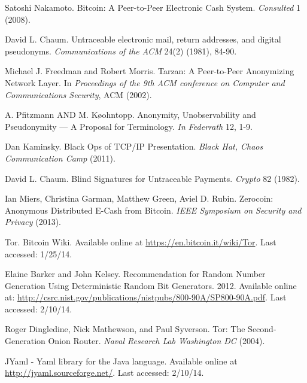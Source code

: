 \documentclass[conference]{IEEEtran}
\begin{document}







\begin{thebibliography}{1}

 Satoshi Nakamoto. Bitcoin: A Peer-to-Peer Electronic Cash System. \emph{Consulted} 1 (2008).

 David L. Chaum. Untraceable electronic mail, return addresses, and digital pseudonyms. \emph{Communications of the ACM} 24(2) (1981), 84-90.

 Michael J. Freedman and Robert Morris. Tarzan: A Peer-to-Peer Anonymizing Network Layer. In \emph{Proceedings of the 9th ACM conference on Computer and Communications Security}, ACM (2002).

 A. Pfitzmann AND M. K\o{o}hntopp. Anonymity, Unobservability and Pseudonymity — A Proposal for Terminology. \emph{In Federrath} 12, 1-9.

 Dan Kaminsky. Black Ops of TCP/IP Presentation. \emph{Black Hat, Chaos Communication Camp} (2011).

 David L. Chaum. Blind Signatures for Untraceable Payments. \emph{Crypto} 82 (1982).

 Ian Miers, Christina Garman, Matthew Green, Aviel D. Rubin. Zerocoin: Anonymous Distributed E-Cash from Bitcoin. \emph{IEEE Symposium on Security and Privacy} (2013).

 Tor. Bitcoin Wiki. Available online at \url{https://en.bitcoin.it/wiki/Tor}. Last accessed: 1/25/14.

 Elaine Barker and John Kelsey. Recommendation for Random Number Generation Using Deterministic Random Bit Generators. 2012. Available online at: \url{http://csrc.nist.gov/publications/nistpubs/800-90A/SP800-90A.pdf}. Last accessed: 2/10/14. 

 Roger Dingledine, Nick Mathewson, and Paul Syverson. Tor: The Second-Generation Onion Router. \emph{Naval Research Lab Washington DC} (2004).

 JYaml - Yaml library for the Java language. Available online at \url{http://jyaml.sourceforge.net/}. Last accessed: 2/10/14. 



\end{thebibliography}
\end{document}

